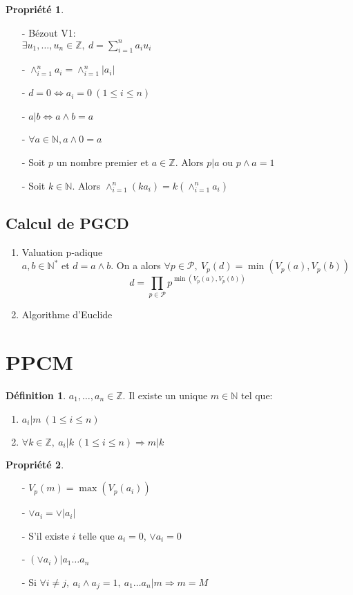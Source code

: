 \documentclass[fleqn]{article}
\theoremstyle{definition} \newtheorem*{defi}{D\'efinition}
\theoremstyle{definition} \newtheorem*{theo}{Th\'eor\`eme}
\theoremstyle{definition} \newtheorem*{coro}{Corollaire}
\theoremstyle{remark} \newtheorem*{rqs}{Remarques}
\theoremstyle{definition} \newtheorem*{prop}{Propri\'et\'e}
\begin{document}
\pagebreak

\begin{prop} $ $
	\begin{enumerate}
		\item [-] B\'ezout V1:\\
			$\exists u_1, \hdots, u_n \in \mathbb{Z},\ d = \sum_{i = 1}^{n} a_iu_i$
		\item [-] $\land_{i = 1}^{n}a_i = \land_{i = 1}^n |a_i|$
		\item [-] $d = 0 \Leftrightarrow a_i = 0\ (1 \leq i \leq n)$
		\item [-] $a | b \Leftrightarrow a \land b = a$
		\item [-] $\forall a \in \mathbb{N}, a \land 0 = a$
		\item [-] Soit $p$ un nombre premier et $a \in \mathbb{Z}$. Alors $p|a$ ou $p \land a = 1$
		\item [-] Soit $k \in \mathbb{N}$. Alors $\land_{i = 1}^n (ka_i) = k(\land_{i = 1}^n a_i)$
	\end{enumerate}
\end{prop}

\subsection{Calcul de PGCD}
\begin{enumerate}
	\item Valuation p-adique \\
		$a, b \in \mathbb{N}^*$ et $d = a \land b$. On a alors $\forall p \in \mathcal{P},\ V_p(d) = \min(V_p(a), V_p(b))$
		\[d = \prod_{p \in \mathcal{P}} p^{\min(V_p(a), V_p(b))}\]
	\item Algorithme d'Euclide
\end{enumerate}

\section{PPCM}
\begin{defi} $a_1, \hdots, a_n \in \mathbb{Z}$. Il existe un unique $m \in \mathbb{N}$ tel que:
	\begin{enumerate}
		\item $a_i |m\ (1 \leq i \leq n)$
		\item $\forall k \in \mathbb{Z},\ a_i | k\ (1 \leq i \leq n) \Rightarrow m | k$
	\end{enumerate}
\end{defi}

\begin{prop} $ $
	\begin{enumerate}
		\item [-] $V_p(m) = \max (V_p(a_i))$
		\item [-] $\lor a_i = \lor |a_i|$
		\item [-] S'il existe $i$ telle que $a_i = 0$, $\lor a_i = 0$
		\item [-] $(\lor a_i) | a_1 \hdots a_n$
		\item [-] Si $\forall i \neq j,\ a_i \land a_j = 1,\ a_1 \hdots a_n | m \Rightarrow m = M$
	\end{enumerate}
\end{prop}
\end{document}
